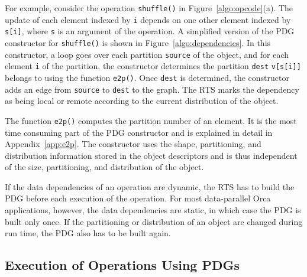 \documentclass{acmtrans2e}
\begin{document}

For example, consider the operation \verb+shuffle()+ in
Figure~\ref{algo:opcode}(a). The update of each element indexed by
\verb+i+ depends on one other element indexed by \verb+s[i]+, where
\verb+s+ is an argument of the operation. A simplified version of the
PDG constructor for \verb+shuffle()+ is shown in
Figure~\ref{algo:dependencies}. In this constructor, a loop goes over
each partition \verb+source+ of the object, and for each element
\verb+i+ of the partition, the constructor determines the partition
\verb+dest+ \verb+v[s[i]]+ belongs to using the function
\verb+e2p()+. Once \verb+dest+ is determined, the constructor adds an
edge from \verb+source+ to \verb+dest+ to the graph. The RTS marks the
dependency as being local or remote according to the current
distribution of the object. 

The function \verb+e2p()+ computes the partition number of an
element. It is the most time consuming part of the PDG constructor and
is explained in detail in Appendix~\ref{app:e2p}. The constructor uses
the shape, partitioning, and distribution information stored in the
object descriptors and is thus independent of the size, partitioning,
and distribution of the object.

If the data dependencies of an operation are dynamic, the RTS has to build
the PDG before each execution of the operation. For most data-parallel
Orca applications, however, the data dependencies are static,
in which case the PDG is built only once. If the partitioning
or distribution of an object are changed during run time, the PDG also
has to be built again.

\subsection{Execution of Operations Using PDGs}

\end{document}
